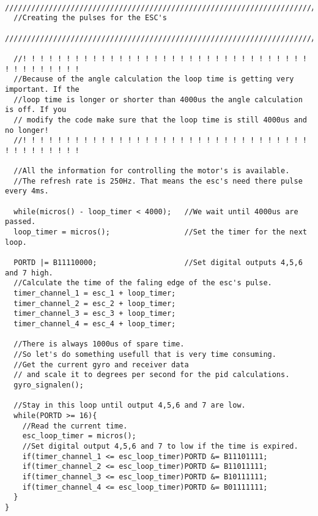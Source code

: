 \begin{lstlisting}
  //////////////////////////////////////////////////////////////////////////////////////  
  //Creating the pulses for the ESC's
  //////////////////////////////////////////////////////////////////////////////////////  

  //! ! ! ! ! ! ! ! ! ! ! ! ! ! ! ! ! ! ! ! ! ! ! ! ! ! ! ! ! ! ! ! ! ! ! ! ! ! ! ! ! !
  //Because of the angle calculation the loop time is getting very important. If the 
  //loop time is longer or shorter than 4000us the angle calculation is off. If you 
  // modify the code make sure that the loop time is still 4000us and no longer! 
  //! ! ! ! ! ! ! ! ! ! ! ! ! ! ! ! ! ! ! ! ! ! ! ! ! ! ! ! ! ! ! ! ! ! ! ! ! ! ! ! ! !                
  
  //All the information for controlling the motor's is available.
  //The refresh rate is 250Hz. That means the esc's need there pulse every 4ms.

  while(micros() - loop_timer < 4000);   //We wait until 4000us are passed.
  loop_timer = micros();                 //Set the timer for the next loop.

  PORTD |= B11110000;                    //Set digital outputs 4,5,6 and 7 high.
  //Calculate the time of the faling edge of the esc's pulse.
  timer_channel_1 = esc_1 + loop_timer;  
  timer_channel_2 = esc_2 + loop_timer;                                     
  timer_channel_3 = esc_3 + loop_timer;                                     
  timer_channel_4 = esc_4 + loop_timer;                                     
  
  //There is always 1000us of spare time. 
  //So let's do something usefull that is very time consuming.
  //Get the current gyro and receiver data
  // and scale it to degrees per second for the pid calculations.
  gyro_signalen();

  //Stay in this loop until output 4,5,6 and 7 are low.
  while(PORTD >= 16){
    //Read the current time.
    esc_loop_timer = micros();                                              
    //Set digital output 4,5,6 and 7 to low if the time is expired.
    if(timer_channel_1 <= esc_loop_timer)PORTD &= B11101111;                
    if(timer_channel_2 <= esc_loop_timer)PORTD &= B11011111;                
    if(timer_channel_3 <= esc_loop_timer)PORTD &= B10111111;                
    if(timer_channel_4 <= esc_loop_timer)PORTD &= B01111111;                
  }
}


\end{lstlisting}
